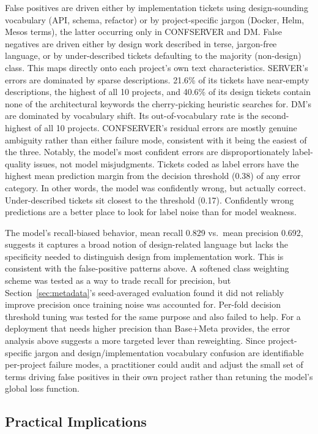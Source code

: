 \documentclass[preprint,12pt]{elsarticle}
\begin{document}
False positives are driven either by implementation tickets using design-sounding vocabulary (API, schema, refactor) or by project-specific jargon (Docker, Helm, Mesos terms), the latter occurring only in CONFSERVER and DM. False negatives are driven either by design work described in terse, jargon-free language, or by under-described tickets defaulting to the majority (non-design) class. This maps directly onto each project's own text characteristics. SERVER's errors are dominated by sparse descriptions. 21.6\% of its tickets have near-empty descriptions, the highest of all 10 projects, and 40.6\% of its design tickets contain none of the architectural keywords the cherry-picking heuristic searches for. DM's are dominated by vocabulary shift. Its out-of-vocabulary rate is the second-highest of all 10 projects. CONFSERVER's residual errors are mostly genuine ambiguity rather than either failure mode, consistent with it being the easiest of the three. Notably, the model's most confident errors are disproportionately label-quality issues, not model misjudgments. Tickets coded as label errors have the highest mean prediction margin from the decision threshold (0.38) of any error category. In other words, the model was confidently wrong, but actually correct. Under-described tickets sit closest to the threshold (0.17). Confidently wrong predictions are a better place to look for label noise than for model weakness.

The model's recall-biased behavior, mean recall 0.829 vs.\ mean precision 0.692, suggests it captures a broad notion of design-related language but lacks the specificity needed to distinguish design from implementation work. This is consistent with the false-positive patterns above. A softened class weighting scheme was tested as a way to trade recall for precision, but Section~\ref{sec:metadata}'s seed-averaged evaluation found it did not reliably improve precision once training noise was accounted for. Per-fold decision threshold tuning was tested for the same purpose and also failed to help. For a deployment that needs higher precision than Base+Meta provides, the error analysis above suggests a more targeted lever than reweighting. Since project-specific jargon and design/implementation vocabulary confusion are identifiable per-project failure modes, a practitioner could audit and adjust the small set of terms driving false positives in their own project rather than retuning the model's global loss function.

\subsection{Practical Implications}
\end{document}
